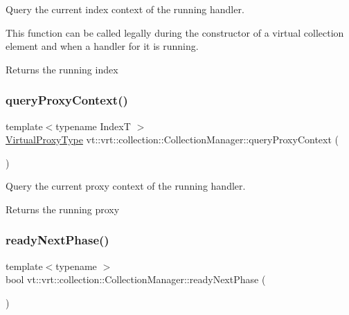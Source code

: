 Query the current index context of the running handler. 

This function can be called legally during the constructor of a virtual collection element and when a handler for it is running.

\begin{DoxyReturn}{Returns}
the running index 
\end{DoxyReturn}
\mbox{\label{structvt_1_1vrt_1_1collection_1_1_collection_manager_a77d8832834659c44badf499c4770777b}} 
\subsubsection{\texorpdfstring{query\+Proxy\+Context()}{queryProxyContext()}}
{\footnotesize\ttfamily template$<$typename IndexT $>$ \\
\hyperlink{namespacevt_a1b417dd5d684f045bb58a0ede70045ac}{Virtual\+Proxy\+Type} vt\+::vrt\+::collection\+::\+Collection\+Manager\+::query\+Proxy\+Context (\begin{DoxyParamCaption}{ }\end{DoxyParamCaption})\hspace{0.3cm}{\ttfamily [static]}}



Query the current proxy context of the running handler. 

\begin{DoxyReturn}{Returns}
the running proxy 
\end{DoxyReturn}
\mbox{\label{structvt_1_1vrt_1_1collection_1_1_collection_manager_ae47451b1fb1fd640929995d964e052a6}} 
\subsubsection{\texorpdfstring{ready\+Next\+Phase()}{readyNextPhase()}}
{\footnotesize\ttfamily template$<$typename $>$ \\
bool vt\+::vrt\+::collection\+::\+Collection\+Manager\+::ready\+Next\+Phase (\begin{DoxyParamCaption}{ }\end{DoxyParamCaption})}



